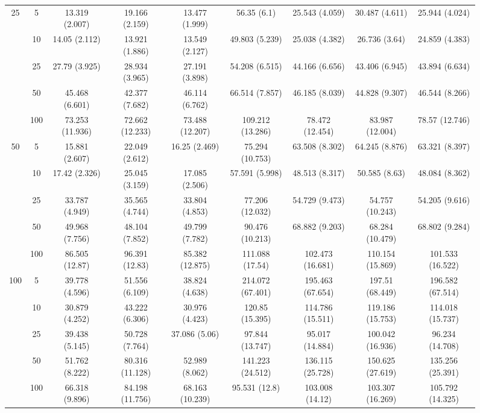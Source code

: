 \documentclass[10pt]{article}
\theoremstyle{definition}
\begin{document}
\begin{sidewaysfigure}
\begin{tabular}{cc|ccc|cccc}
   \multirow{5}{*}{25} & 5  & 13.319 (2.007) & 19.166 (2.159) & 13.477 (1.999) & 56.35 (6.1) & 25.543 (4.059) & 30.487 (4.611) & 25.944 (4.024) \\ 
    & 10  & 14.05 (2.112) & 13.921 (1.886) & 13.549 (2.127) & 49.803 (5.239) & 25.038 (4.382) & 26.736 (3.64) & 24.859 (4.383) \\ 
    & 25  & 27.79 (3.925) & 28.934 (3.965) & 27.191 (3.898) & 54.208 (6.515) & 44.166 (6.656) & 43.406 (6.945) & 43.894 (6.634) \\ 
    & 50  & 45.468 (6.601) & 42.377 (7.682) & 46.114 (6.762) & 66.514 (7.857) & 46.185 (8.039) & 44.828 (9.307) & 46.544 (8.266) \\ 
    & 100  & 73.253 (11.936) & 72.662 (12.233) & 73.488 (12.207) & 109.212 (13.286) & 78.472 (12.454) & 83.987 (12.004) & 78.57 (12.746) \\[.3cm]  
   \multirow{5}{*}{50} & 5  & 15.881 (2.607) & 22.049 (2.612) & 16.25 (2.469) & 75.294 (10.753) & 63.508 (8.302) & 64.245 (8.876) & 63.321 (8.397) \\ 
    & 10  & 17.42 (2.326) & 25.045 (3.159) & 17.085 (2.506) & 57.591 (5.998) & 48.513 (8.317) & 50.585 (8.63) & 48.084 (8.362) \\ 
    & 25  & 33.787 (4.949) & 35.565 (4.744) & 33.804 (4.853) & 77.206 (12.032) & 54.729 (9.473) & 54.757 (10.243) & 54.205 (9.616) \\ 
    & 50  & 49.968 (7.756) & 48.104 (7.852) & 49.799 (7.782) & 90.476 (10.213) & 68.882 (9.203) & 68.284 (10.479) & 68.802 (9.284) \\ 
    & 100  & 86.505 (12.87) & 96.391 (12.83) & 85.382 (12.875) & 111.088 (17.54) & 102.473 (16.681) & 110.154 (15.869) & 101.533 (16.522) \\[.3cm]  
   \multirow{5}{*}{100} & 5  & 39.778 (4.596) & 51.556 (6.109) & 38.824 (4.638) & 214.072 (67.401) & 195.463 (67.654) & 197.51 (68.449) & 196.582 (67.514) \\ 
    & 10  & 30.879 (4.252) & 43.222 (6.306) & 30.976 (4.423) & 120.85 (15.395) & 114.786 (15.511) & 119.186 (15.753) & 114.018 (15.737) \\ 
    & 25  & 39.438 (5.145) & 50.728 (7.764) & 37.086 (5.06) & 97.844 (13.747) & 95.017 (14.884) & 100.042 (16.936) & 96.234 (14.708) \\ 
    & 50  & 51.762 (8.222) & 80.316 (11.128) & 52.989 (8.062) & 141.223 (24.512) & 136.115 (25.728) & 150.625 (27.619) & 135.256 (25.391) \\ 
    & 100  & 66.318 (9.896) & 84.198 (11.756) & 68.163 (10.239) & 95.531 (12.8) & 103.008 (14.12) & 103.307 (16.269) & 105.792 (14.325) \\ 
\end{tabular}
\end{sidewaysfigure}
\end{document}
